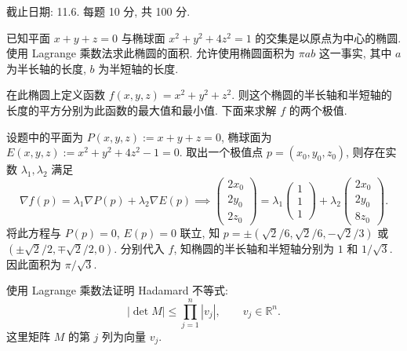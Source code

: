 \documentclass{article}
\begin{document}
截止日期: 11.6. 每题 10 分, 共 100 分.

\begin{problem}
  已知平面 $x+y+z=0$ 与椭球面 $x^2+y^2+4z^2=1$ 的交集是以原点为中心的椭圆. 使用 Lagrange 乘数法求此椭圆的面积. 允许使用椭圆面积为 $\pi ab$ 这一事实, 其中 $a$ 为半长轴的长度, $b$ 为半短轴的长度.
\end{problem}

\begin{solution}
	在此椭圆上定义函数 $f(x,y,z) = x^2 + y^2 + z^2$. 则这个椭圆的半长轴和半短轴的长度的平方分别为此函数的最大值和最小值. 下面来求解 $f$ 的两个极值.

	设题中的平面为 $P(x,y,z) := x + y + z = 0$, 椭球面为 $E(x, y, z) := x^2 + y^2 + 4z^2 - 1 = 0$. 取出一个极值点 $p = (x_0, y_0, z_0)$, 则存在实数 $\lambda_1, \lambda_2$ 满足
	\[ \nabla f(p) = \lambda_1 \nabla P(p) + \lambda_2 \nabla E(p)
	\implies \begin{pmatrix}
		2x_0 \\ 2y_0 \\ 2z_0
	\end{pmatrix}
	= \lambda_1 \begin{pmatrix}
		1 \\ 1 \\ 1
	\end{pmatrix} + \lambda_2 \begin{pmatrix}
		2x_0 \\ 2y_0 \\ 8z_0
	\end{pmatrix}. \]
	将此方程与 $P(p) = 0$, $E(p) = 0$ 联立, 知 $p = \pm(\sqrt{2}/6, \sqrt{2}/6, -\sqrt{2}/3)$ 或 $(\pm \sqrt{2}/2, \mp \sqrt{2}/2, 0)$. 分别代入 $f$, 知椭圆的半长轴和半短轴分别为 $1$ 和 $1/\sqrt{3}$. 因此面积为 $\pi/\sqrt{3}$.
\end{solution}



\begin{problem}
  使用 Lagrange 乘数法证明 Hadamard 不等式:
  \[
    |\det M|\leq\prod_{j=1}^n|v_j|,\qquad v_j\in\mathbb{R}^n.
  \]
  这里矩阵 $M$ 的第 $j$ 列为向量 $v_j$.
\end{problem}
\end{document}
